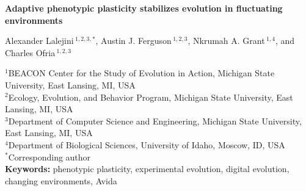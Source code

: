 \documentclass[utf8]{article}
\begin{document}
\onecolumn








\begin{center}
  \begin{Large}
  \textbf{Adaptive phenotypic plasticity stabilizes evolution in fluctuating environments}
  \end{Large}

  Alexander Lalejini\,$^{1,2,3,*}$, Austin J. Ferguson\,$^{1,2,3}$, Nkrumah A. Grant\,$^{1,4}$, and Charles Ofria\,$^{1,2,3}$ \\

\end{center}

  $^{1}$BEACON Center for the Study of Evolution in Action, Michigan State University, East Lansing, MI, USA \\
  $^{2}$Ecology, Evolution, and Behavior Program, Michigan State University, East Lansing, MI, USA \\
  $^{3}$Department of Computer Science and Engineering, Michigan State University, East Lansing, MI, USA \\
  $^{4}$Department of Biological Sciences, University of Idaho, Moscow, ID, USA \\
  $^{*}$Corresponding author \\

  \textbf{Keywords:} phenotypic plasticity, experimental evolution, digital evolution, changing environments, Avida






\end{document}
